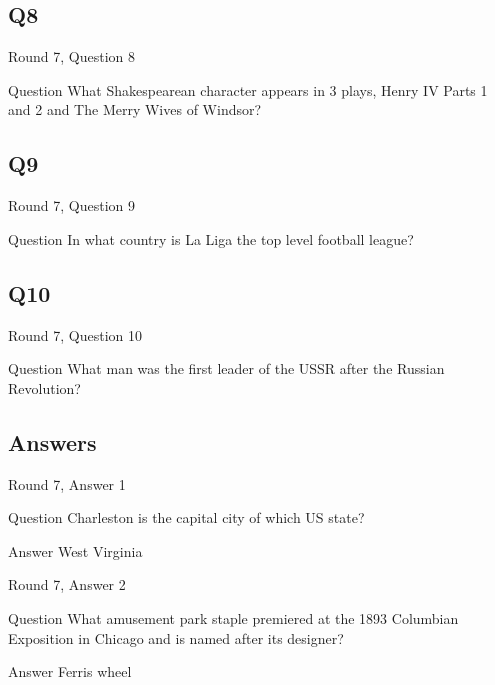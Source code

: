 \documentclass[11pt]{beamer}
\begin{document}
\subsection*{Q8}
\begin{frame}[t]{Round 7, Question 8}
\vspace{2em}
\begin{block}{Question}
What Shakespearean character appears in 3 plays, Henry IV Parts 1 and 2 and The Merry Wives of Windsor\@?
\end{block}
\end{frame}
    

\subsection*{Q9}
\begin{frame}[t]{Round 7, Question 9}
\vspace{2em}
\begin{block}{Question}
In what country is La Liga the top level football league\@?
\end{block}
\end{frame}
    

\subsection*{Q10}
\begin{frame}[t]{Round 7, Question 10}
\vspace{2em}
\begin{block}{Question}
What man was the first leader of the USSR after the Russian Revolution\@?
\end{block}
\end{frame}
    
\subsection{Answers}

\begin{frame}[t]{Round 7, Answer 1}
\vspace{2em}
\begin{block}{Question}
Charleston is the capital city of which US state\@?
\end{block}
\pause{}
\begin{block}{Answer}
West Virginia
\end{block}
\end{frame}
    

\begin{frame}[t]{Round 7, Answer 2}
\vspace{2em}
\begin{block}{Question}
What amusement park staple premiered at the 1893 Columbian Exposition in Chicago and is named after its designer\@?
\end{block}
\pause{}
\begin{block}{Answer}
Ferris wheel
\end{block}
\end{frame}
    
\end{document}
